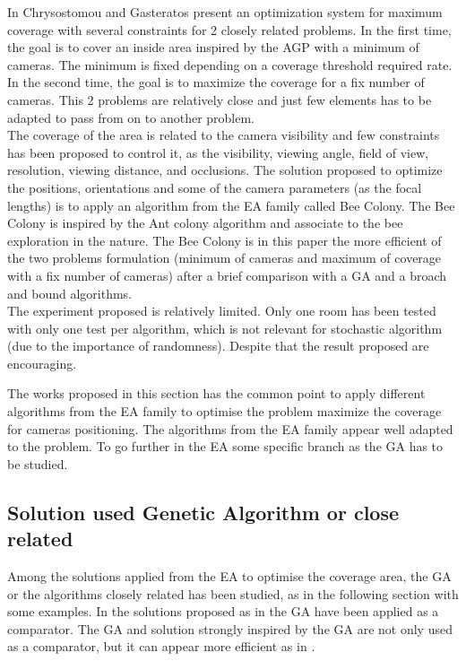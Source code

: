  In Chrysostomou and Gasteratos \cite{82*chrysostomou2012} present an optimization system for maximum coverage with several constraints for 2 closely related problems. In the first time, the goal is to cover an inside area inspired by the AGP with a minimum of cameras.  The minimum is fixed depending  on a coverage threshold required rate. In the second time, the goal is to maximize the coverage for a fix number of cameras. This 2 problems are relatively close and just few elements has to be adapted to pass from on to another problem.\\
The coverage of the area is related to the camera visibility and few constraints has been proposed to control it, as the visibility, viewing angle, field of view, resolution, viewing distance, and occlusions. The solution proposed to optimize the positions, orientations and some of the camera parameters (as the focal lengths) is to apply an algorithm from the EA family called Bee Colony. The Bee Colony is inspired by the Ant colony algorithm and associate to the bee exploration in the nature. The Bee Colony is in this  paper \cite{82*chrysostomou2012} the more efficient of the two problems formulation (minimum of cameras and maximum of coverage with a fix number of cameras) after a brief comparison with a GA and a broach and bound algorithms. \\
The experiment proposed is relatively limited. Only one room has been tested with only one test per algorithm, which is not relevant for stochastic algorithm (due to the importance of randomness). Despite that the result proposed are encouraging. 

The works proposed in this section has the common point to apply different algorithms from the EA family to optimise the problem maximize the coverage for cameras positioning. The algorithms from the EA family appear well adapted to the problem. To go further in the EA some specific branch as the GA has to be studied.

\subsection{Solution used Genetic Algorithm or close related}

 Among the solutions applied from the EA to optimise the coverage area, the GA or the algorithms closely related has been studied, as in the following section with some examples.
 In the solutions proposed as in \cite{82*chrysostomou2012,33*reddy2012,141*akbarzadeh2013} the GA have been applied as a comparator. The GA and solution strongly inspired by the GA  are not only used as a comparator, but it can appear more efficient as in \cite{83*van2009,101*topcuoglu2009,165*jiang2010,152*wang2009}.


